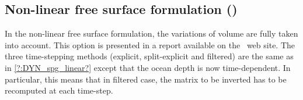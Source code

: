 \documentclass[../main/NEMO_manual]{subfiles}
\begin{document}
\subsection[Non-linear free surface formulation (\texttt{\textbf{key\_vvl}})]{Non-linear free surface formulation (\protect{})}
\label{subsec:MBZ_dyn_spg_vvl}

In the non-linear free surface formulation, the variations of volume are fully taken into account.
This option is presented in a report \citep{levier.treguier.ea_rpt07} available on the \NEMO\ web site.
The three time-stepping methods (explicit, split-explicit and filtered) are the same as in
\autoref{?:DYN_spg_linear?} except that the ocean depth is now time-dependent.
In particular, this means that in filtered case, the matrix to be inverted has to be recomputed at each time-step.

\subinc{}
\end{document}
